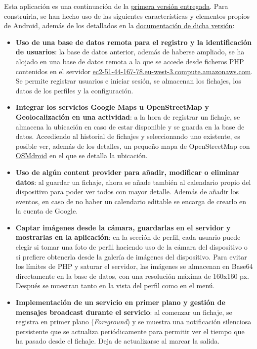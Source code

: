 Esta aplicación es una continuación de la \href{https://github.com/ffernandezco/DAS-Proyecto}{primera versión entregada}. Para construirla, se han hecho uso de las siguientes características y elementos propios de Android, además de los detallados en la \href{https://github.com/ffernandezco/DAS-Proyecto/blob/main/doc/handout.pdf}{documentación de dicha versión}:

\begin{itemize}
    \item \textbf{Uso de una base de datos remota para el registro y la identificación de usuarios}: la base de datos anterior, además de haberse ampliado, se ha alojado en una base de datos remota a la que se accede desde ficheros PHP contenidos en el servidor \url{ec2-51-44-167-78.eu-west-3.compute.amazonaws.com}. Se permite registrar usuarios e iniciar sesión, se almacenan los fichajes, los datos de los perfiles y la configuración.
    \item \textbf{Integrar los servicios Google Maps u OpenStreetMap y Geolocalización en una actividad}: a la hora de registrar un fichaje, se almacena la ubicación en caso de estar disponible y se guarda en la base de datos. Accediendo al historial de fichajes y seleccionando uno existente, es posible ver, además de los detalles, un pequeño mapa de OpenStreetMap con \href{https://github.com/osmdroid/osmdroid}{OSMdroid} en el que se detalla la ubicación.
    \item \textbf{Uso de algún content provider para añadir, modificar o eliminar datos}: al guardar un fichaje, ahora se añade también al calendario propio del dispositivo para poder ver todos con mayor detalle. Además de añadir los eventos, en caso de no haber un calendario editable se encarga de crearlo en la cuenta de Google.
    \item \textbf{Captar imágenes desde la cámara, guardarlas en el servidor y mostrarlas en la aplicación}: en la sección de perfil, cada usuario puede elegir si tomar una foto de perfil haciendo uso de la cámara del dispositivo o si prefiere obtenerla desde la galería de imágenes del dispositivo. Para evitar los límites de PHP y saturar el servidor, las imágenes se almacenan en Base64 directamente en la base de datos, con una resolución máxima de 160x160 px. Después se muestran tanto en la vista del perfil como en el menú.
    \item \textbf{Implementación de un servicio en primer plano y gestión de mensajes broadcast durante el servicio}: al comenzar un fichaje, se registra en primer plano (\textit{Foreground}) y se muestra una notificación silenciosa persistente que se actualiza periódicamente para permitir ver el tiempo que ha pasado desde el fichaje. Deja de actualizarse al marcar la salida.

\end{itemize}
